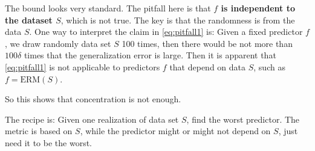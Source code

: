 \documentclass[11pt,a4paper]{article}
\begin{document}
The bound looks very standard. The pitfall here is that \textbf{$f$ is independent to the dataset $S$}, which is not true. The key is that the randomness is from the data $S$. One way to interpret the claim in \eqref{eq:pitfall1} is: Given a fixed predictor $f$, we draw randomly data set $S$ 100 times, then there would be not more than $100\delta$ times that the generalization error is large. Then it is apparent that \eqref{eq:pitfall1} is not applicable to predictors $f$ that depend on data $S$, such as $f = \text{ERM}(S)$.

So this shows that concentration is not enough.

The recipe is: Given one realization of data set $S$, find the worst predictor. The metric is based on $S$, while the predictor might or might not depend on $S$, just need it to be the worst.
\end{document}
